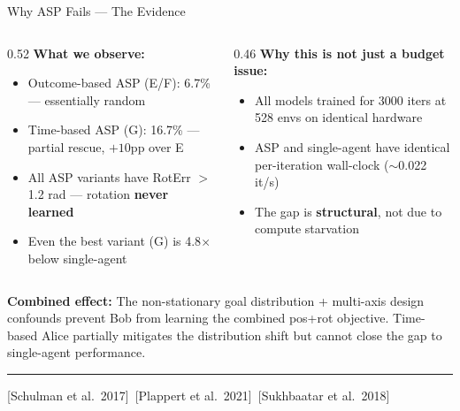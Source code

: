 \documentclass[aspectratio=169,xcolor=dvipsnames,t]{beamer}
\newcommand{\litfooter}[1]{%
  \vspace{2pt}%
  \hrule%
  \vspace{2pt}%
  {\tiny\color{LightDarkGrey} #1}%
}
\begin{document}
\begin{frame}[t]{Why ASP Fails — The Evidence}
  \begin{columns}[T,onlytextwidth]
    \begin{column}{0.52\textwidth}
      \textbf{What we observe:}
      \begin{itemize}
        \item Outcome-based ASP (E/F): 6.7\% — essentially random
        \item Time-based ASP (G): 16.7\% — partial rescue, $+10$pp over E
        \item All ASP variants have RotErr $>$ 1.2 rad — rotation \textbf{never learned}
        \item Even the best variant (G) is 4.8$\times$ below single-agent
      \end{itemize}
    \end{column}
    \begin{column}{0.46\textwidth}
      \textbf{Why this is not just a budget issue:}
      \begin{itemize}
        \item All models trained for 3000 iters at 528 envs on identical hardware
        \item ASP and single-agent have identical per-iteration wall-clock ($\sim$0.022 it/s)
        \item The gap is \textbf{structural}, not due to compute starvation
      \end{itemize}
    \end{column}
  \end{columns}

  \vspace{6pt}
  \textbf{Combined effect:} The non-stationary goal distribution + multi-axis design confounds prevent Bob from learning the combined pos+rot objective. Time-based Alice partially mitigates the distribution shift but cannot close the gap to single-agent performance.

  \vfill\litfooter{[Schulman et al.\ 2017]~[Plappert et al.\ 2021]~[Sukhbaatar et al.\ 2018]}
\end{frame}
\end{document}
